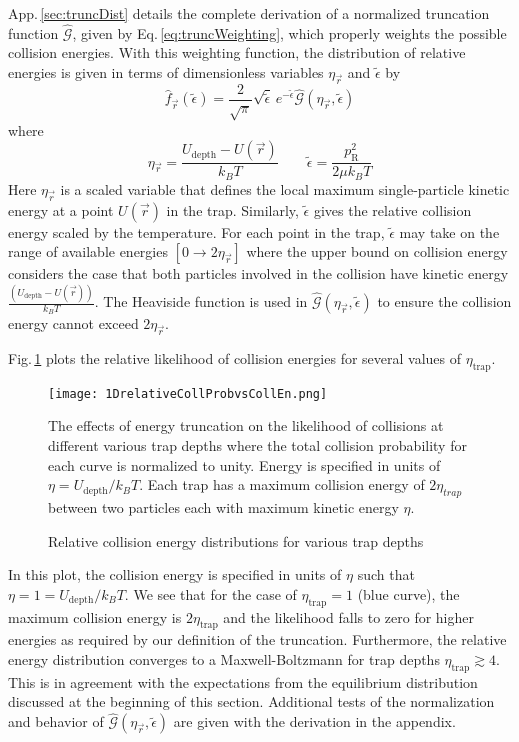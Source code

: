 App.\,\ref{sec:truncDist} details the complete derivation of a normalized truncation function $\hat{\mathcal{G}}$, given by Eq.\,\ref{eq:truncWeighting}, which properly weights the possible collision energies.
With this weighting function, the distribution of relative energies is given in terms of dimensionless variables $\eta_\vec{r}$ and $\tilde{\epsilon}$ by
\begin{equation} \label{eq:truncRelBolz}
	\hat{f}_{\vec{r}}(\tilde{\epsilon}) = \frac{2}{\sqrt{\pi}} \sqrt{\tilde{\epsilon}} \, e^{-\tilde{\epsilon}} \hat{\mathcal{G}}(\eta_{\vec{r}}, \tilde{\epsilon})
\end{equation}
where
\begin{equation}
	\eta_\vec{r} = \frac{U_\text{depth} - U(\vec{r})}{k_B T} \quad \quad \tilde{\epsilon} = \frac{p_\text{R}^2}{2 \mu k_B T} 
\end{equation}
Here $\eta_\vec{r}$ is a scaled variable that defines the local maximum single-particle kinetic energy at a point $U(\vec{r})$ in the trap.
Similarly, $\tilde{\epsilon}$ gives the relative collision energy scaled by the temperature.
For each point in the trap, $\tilde{\epsilon}$ may take on the range of available energies $[ 0 \rightarrow 2\eta_\vec{r} ]$ where the upper bound on collision energy considers the case that both particles involved in the collision have kinetic energy $\displaystyle \frac{(U_\text{depth} - U(\vec{r}))}{k_B T}$.
The Heaviside function is used in $\hat{\mathcal{G}}(\eta_{\vec{r}}, \tilde{\epsilon})$ to ensure the collision energy cannot exceed $2\eta_\vec{r}$.

Fig.\,\ref{fig:relativeCollProb} plots the relative likelihood of collision energies for several values of $\eta_\text{trap}$.
	\begin{figure} 
	\centerline{
	  \texttt{[image: 1DrelativeCollProbvsCollEn.png]}}
	  \caption{Relative collision energy distributions for various trap depths}{The effects of energy truncation on the likelihood of collisions at different various trap depths where the total collision probability for each curve is normalized to unity. Energy is specified in units of $\eta = U_{\text{depth}}/k_B T$. Each trap has a maximum collision energy of $2\eta_{trap}$ between two particles each with maximum kinetic energy $\eta$.}
	  \label{fig:relativeCollProb}
	\end{figure}
In this plot, the collision energy is specified in units of $\eta$ such that $\eta=1=U_\text{depth}/k_B T$.
We see that for the case of $\eta_\text{trap}=1$ (blue curve), the maximum collision energy is $2\eta_\text{trap}$ and the likelihood falls to zero for higher energies as required by our definition of the truncation.
Furthermore, the relative energy distribution converges to a Maxwell-Boltzmann for trap depths $\eta_\text{trap} \gtrsim 4$.
This is in agreement with the expectations from the equilibrium distribution discussed at the beginning of this section.
Additional tests of the normalization and behavior of $\hat{\mathcal{G}}(\eta_{\vec{r}}, \tilde{\epsilon})$ are given with the derivation in the appendix.

